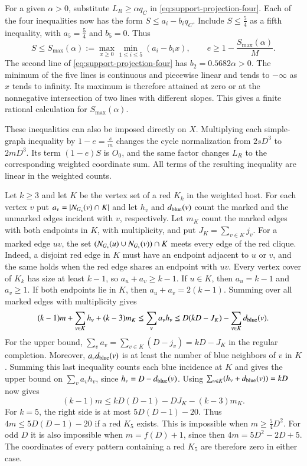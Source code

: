 \documentclass[preprint,11pt,numbers]{elsarticle-arxiv}
\numberwithin{equation}{section}
\theoremstyle{definition}
\begin{document}
For a given $\alpha>0$, substitute $L_R\geq\alpha q_C$ in
\eqref{eq:support-projection-four}. Each of the four inequalities
now has the form $S\leq a_i-b_iq_C$. Include $S\leq\frac54$ as
a fifth inequality, with $a_5=\frac54$ and $b_5=0$. Thus
\[
 S\leq S_{\max}(\alpha):=
 \max_{x\geq0}\min_{1\leq i\leq5}(a_i-b_ix),
 \qquad e\geq1-\frac{S_{\max}(\alpha)}{M}.
\]
The second line of \eqref{eq:support-projection-four} has
$b_2=0.5682\alpha>0$. The minimum of the five lines is continuous
and piecewise linear and tends to $-\infty$ as $x$ tends to infinity.
Its maximum is therefore attained at zero or at the nonnegative
intersection of two lines with different slopes. This gives a finite
rational calculation for $S_{\max}(\alpha)$.

These inequalities can also be imposed directly on $X$. Multiplying
each simple-graph inequality by $1-e=\frac{s}{m}$ changes the cycle
normalization from $2sD^3$ to $2mD^3$. Its term $(1-e)S$ is $O_0$,
and the same factor changes $L_R$ to the corresponding weighted
coordinate sum. All terms of the resulting inequality are linear
in the weighted counts.

Let $k\geq3$ and let $K$ be the vertex set of a red $K_k$ in the weighted host.
For each vertex $v$ put $a_v=|N_{G_{\rm s}}(v)\cap K|$ and let
$h_v$ and $d_{\rm blue}(v)$ count the marked and the unmarked edges
incident with $v$, respectively. Let $m_K$ count the marked edges with
both endpoints in $K$, with multiplicity, and put
$J_K=\sum_{v\in K}j_v$. For a marked edge $uv$, the set
$(N_{G_{\rm s}}(u)\cup N_{G_{\rm s}}(v))\cap K$ meets every edge
of the red clique. Indeed, a disjoint red edge in $K$ must have an
endpoint adjacent to $u$ or $v$, and the same holds when the red
edge shares an endpoint with $uv$. Every vertex cover of $K_k$ has
size at least $k-1$, so $a_u+a_v\geq k-1$. If $u\in K$, then
$a_u=k-1$ and $a_v\geq1$. If both endpoints lie in $K$, then
$a_u+a_v=2(k-1)$. Summing over all marked edges with multiplicity gives
\[
 (k-1)m+\sum_{v\in K}h_v+(k-3)m_K
 \le\sum_v a_vh_v
 \le D(kD-J_K)-\sum_{v\in K}d_{\rm blue}(v).
\]
For the upper bound, $\sum_v a_v=\sum_{v\in K}(D-j_v)=kD-J_K$
in the regular completion. Moreover, $a_vd_{\rm blue}(v)$ is at
least the number of blue neighbors of $v$ in $K$. Summing this
last inequality counts each blue incidence at $K$ and gives the
upper bound on $\sum_v a_vh_v$, since $h_v=D-d_{\rm blue}(v)$.
Using $\sum_{v\in K}(h_v+d_{\rm blue}(v))=kD$ now gives
\[
 (k-1)m\le kD(D-1)-DJ_K-(k-3)m_K.
\]
For $k=5$, the right side is at most $5D(D-1)-20$. Thus $4m\leq5D(D-1)-20$ if a red $K_5$ exists.
This is impossible when $m\geq\frac54D^2$. For odd $D$ it is also
impossible when $m=f(D)+1$, since then $4m=5D^2-2D+5$.
The coordinates of every pattern containing a red $K_5$ are
therefore zero in either case.
\end{document}
